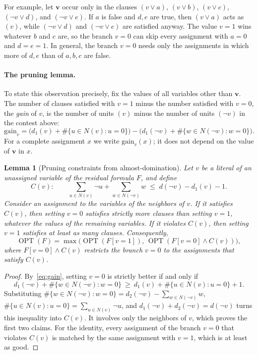 \documentclass[11pt,a4paper]{article}
\newtheorem{lemma}[theorem]{Lemma}
\theoremstyle{definition}
\theoremstyle{remark}
\newcommand{\OPT}{\operatorname{OPT}}
\begin{document}
For example, let $\mathbf v$ occur only in the clauses $(v\vee a)$,
$(v\vee b)$, $(v\vee c)$, $(\neg v\vee d)$, and $(\neg v\vee e)$. If $a$ is
false and $d,e$ are true, then $(v\vee a)$ acts as $(v)$, while
$(\neg v\vee d)$ and $(\neg v\vee e)$ are satisfied anyway. The value $v=1$
wins whatever $b$ and $c$ are, so the branch $v=0$ can skip every assignment
with $a=0$ and $d=e=1$. In general, the branch $v=0$ needs only the
assignments in which more of $d,e$ than of $a,b,c$ are false.

\paragraph{The pruning lemma.}
To state this observation precisely, fix the values of all variables other
than $\mathbf v$. The number of clauses satisfied with $v=1$ minus the
number satisfied with $v=0$, the \emph{gain} of $v$, is the number of units
$(v)$ minus the number of units $(\neg v)$ in the contest above:
\begin{equation}
 \mathrm{gain}_v
 =\bigl(d_1(v)+\#\{u\in N(v):u=0\}\bigr)
 -\bigl(d_1(\neg v)+\#\{w\in N(\neg v):w=0\}\bigr).
 \label{eq:gain}
\end{equation}
For a complete assignment $x$ we write $\mathrm{gain}_v(x)$; it does not
depend on the value of $\mathbf v$ in $x$.

\begin{lemma}[Pruning constraints from almost-domination]\label{lem:pruning}
Let $v$ be a literal of an unassigned variable of the residual formula $F$,
and define
\begin{equation}
 C(v):\qquad \sum_{u\in N(v)}\neg u+\sum_{w\in N(\neg v)}w
 \;\le\;d(\neg v)-d_1(v)-1.
 \label{eq:gap_pruning}
\end{equation}
Consider an assignment to the variables of the neighbors of $v$. If it
satisfies $C(v)$, then setting $v=0$ satisfies strictly more clauses than
setting $v=1$, whatever the values of the remaining variables. If it
violates $C(v)$, then setting $v=1$ satisfies at least as many clauses.
Consequently,
\[
 \OPT(F)=\max\bigl(\OPT(F[v=1]),\,\OPT(F[v=0]\wedge C(v))\bigr),
\]
where $F[v=0]\wedge C(v)$ restricts the branch $v=0$ to the assignments that
satisfy $C(v)$.
\end{lemma}
\begin{proof}
By~\eqref{eq:gain}, setting $v=0$ is strictly better if and only if
\[
 d_1(\neg v)+\#\{w\in N(\neg v):w=0\}\ \ge\ d_1(v)+\#\{u\in N(v):u=0\}+1 .
\]
Substituting $\#\{w\in N(\neg v):w=0\}=d_2(\neg v)-\sum_{w\in N(\neg v)}w$,
$\#\{u\in N(v):u=0\}=\sum_{u\in N(v)}\neg u$, and
$d_1(\neg v)+d_2(\neg v)=d(\neg v)$ turns this inequality into $C(v)$. It
involves only the neighbors of $v$, which proves the first two claims. For
the identity, every assignment of the branch $v=0$ that violates $C(v)$ is
matched by the same assignment with $v=1$, which is at least as good.
\end{proof}
\end{document}

